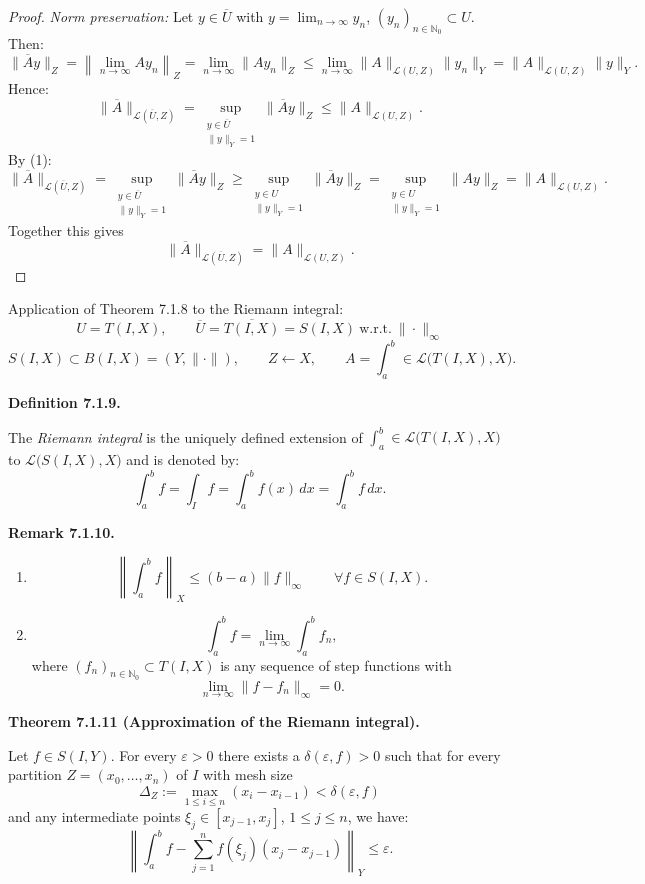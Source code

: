\documentclass[12pt]{article}
\newenvironment{satz}[1]{%
  \par\vspace{6pt}\noindent\textbf{Theorem #1.}\itshape\space
}{%
  \par\vspace{6pt}
}
\newenvironment{definition}[1]{%
  \par\vspace{6pt}\noindent\textbf{Definition #1.}\itshape\space
}{%
  \par\vspace{6pt}
}
\newenvironment{bemerkung}[1]{%
  \par\vspace{6pt}\noindent\textbf{Remark #1.}\itshape\space
}{%
  \par\vspace{6pt}
}
\begin{document}
\begin{proof}
\medskip
\textit{Norm preservation:}
Let $y\in\overline{U}$ with $y=\lim_{n\to\infty}y_n$, $(y_n)_{n\in\mathbb N_0}\subset U$. Then:
\[
\|\overline{A}y\|_Z
=\left\|\lim_{n\to\infty}Ay_n\right\|_Z
=\lim_{n\to\infty}\|Ay_n\|_Z
\le\lim_{n\to\infty}\|A\|_{\mathcal L(U,Z)}\|y_n\|_Y
=\|A\|_{\mathcal L(U,Z)}\|y\|_Y.
\]
Hence:
\[
\|\overline{A}\|_{\mathcal L(\overline{U},Z)}
=\sup_{\substack{y\in\overline{U}\\\|y\|_Y=1}}\|\overline{A}y\|_Z
\le\|A\|_{\mathcal L(U,Z)}.
\]
By (1):
\[
\|\overline{A}\|_{\mathcal L(\overline{U},Z)}
=\sup_{\substack{y\in\overline{U}\\\|y\|_Y=1}}\|\overline{A}y\|_Z
\ge\sup_{\substack{y\in U\\\|y\|_Y=1}}\|\overline{A}y\|_Z
=\sup_{\substack{y\in U\\\|y\|_Y=1}}\|Ay\|_Z
=\|A\|_{\mathcal L(U,Z)}.
\]
Together this gives
\[
\|\overline{A}\|_{\mathcal L(\overline{U},Z)}=\|A\|_{\mathcal L(U,Z)}.
\]
\end{proof}

\noindent Application of Theorem 7.1.8 to the Riemann integral:
\[
U=T(I,X),\qquad
\overline{U}=\overline{T(I,X)}=S(I,X)\ \text{w.r.t.}\ \|\cdot\|_\infty
\]
\[
S(I,X)\subset B(I,X)=(Y,\|\cdot\|),\qquad
Z\leftarrow X,\qquad
A=\int_a^b\in\mathcal L\bigl(T(I,X),X\bigr).
\]

\begin{definition}{7.1.9}
The \emph{Riemann integral} is the uniquely defined extension of
$\int_a^b\in\mathcal L\bigl(T(I,X),X\bigr)$ to $\mathcal L\bigl(S(I,X),X\bigr)$ and is denoted by:
\[
\int_a^b f=\int_I f=\int_a^b f(x)\,dx=\int_a^b f\,dx.
\]
\end{definition}

\begin{bemerkung}{7.1.10}
\begin{enumerate}
    \item
    \[
    \left\|\int_a^b f\right\|_X\le(b-a)\|f\|_\infty
    \qquad\forall f\in S(I,X).
    \]

    \item
    \[
    \int_a^b f=\lim_{n\to\infty}\int_a^b f_n,
    \]
    where $(f_n)_{n\in\mathbb N_0}\subset T(I,X)$ is any sequence of step functions with
    \[
    \lim_{n\to\infty}\|f-f_n\|_\infty=0.
    \]
\end{enumerate}
\end{bemerkung}

\begin{satz}{7.1.11 (Approximation of the Riemann integral)}
Let $f\in S(I,Y)$. For every $\varepsilon>0$ there exists a
$\delta(\varepsilon,f)>0$ such that for every partition $Z=(x_0,\ldots,x_n)$ of $I$ with mesh size
\[
\Delta_Z:=\max_{1\le i\le n}(x_i-x_{i-1})<\delta(\varepsilon,f)
\]
and any intermediate points $\xi_j\in[x_{j-1},x_j]$, $1\le j\le n$, we have:
\[
\left\|\int_a^b f-\sum_{j=1}^{n}f(\xi_j)(x_j-x_{j-1})\right\|_Y\le\varepsilon.
\]
\end{satz}
\end{document}
